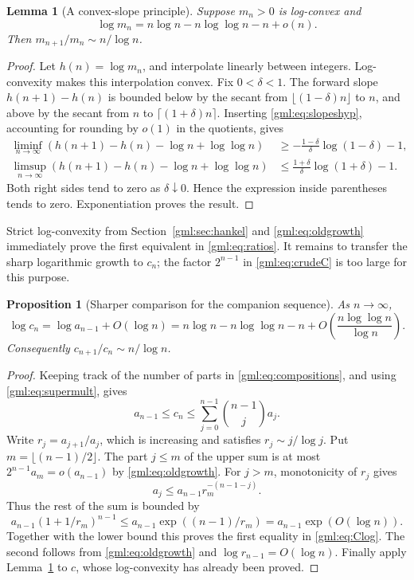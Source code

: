 \documentclass[11pt]{article}
\numberwithin{equation}{section}
\newtheorem{proposition}[theorem]{Proposition}
\newtheorem{lemma}[theorem]{Lemma}
\theoremstyle{definition}
\theoremstyle{remark}
\begin{document}
\begin{lemma}[A convex-slope principle]\label{gml:lem:slopes}
Suppose $m_n>0$ is log-convex and
\begin{equation}\label{gml:eq:slopeshyp}
 \log m_n=n\log n-n\log\log n-n+o(n).
\end{equation}
Then $m_{n+1}/m_n\sim n/\log n$.
\end{lemma}
\begin{proof}
Let $h(n)=\log m_n$, and interpolate linearly between integers. Log-convexity
makes this interpolation convex. Fix $0<\delta<1$. The forward slope
$h(n+1)-h(n)$ is bounded below by the secant from
$\lfloor(1-\delta)n\rfloor$ to $n$, and above by the secant from $n$
to $\lceil(1+\delta)n\rceil$. Inserting \eqref{gml:eq:slopeshyp}, accounting
for rounding by $o(1)$ in the quotients, gives
\begin{align*}
 \liminf_{n\to\infty}\left(h(n+1)-h(n)-\log n+\log\log n\right)
 &\ge -\frac{1-\delta}{\delta}\log(1-\delta)-1,\\
 \limsup_{n\to\infty}\left(h(n+1)-h(n)-\log n+\log\log n\right)
 &\le \frac{1+\delta}{\delta}\log(1+\delta)-1.
\end{align*}
Both right sides tend to zero as $\delta\downarrow0$. Hence the expression
inside parentheses tends to zero. Exponentiation proves the result.
\end{proof}

Strict log-convexity from Section~\ref{gml:sec:hankel} and
\eqref{gml:eq:oldgrowth} immediately prove the first equivalent in
\eqref{gml:eq:ratios}. It remains to transfer the sharp logarithmic growth to $c_n$;
the factor $2^{n-1}$ in \eqref{gml:eq:crudeC} is too large for this purpose.

\begin{proposition}[Sharper comparison for the companion sequence]\label{gml:prop:companion}
As $n\to\infty$,
\begin{equation}\label{gml:eq:Clog}
 \log c_n=\log a_{n-1}+O(\log n)
 =n\log n-n\log\log n-n+
 O\left(\frac{n\log\log n}{\log n}\right).
\end{equation}
Consequently $c_{n+1}/c_n\sim n/\log n$.
\end{proposition}
\begin{proof}
Keeping track of the number of parts in \eqref{gml:eq:compositions}, and
using \eqref{gml:eq:supermult}, gives
\begin{equation}\label{gml:eq:binomialC}
 a_{n-1}\le c_n\le\sum_{j=0}^{n-1}\binom{n-1}{j}a_j.
\end{equation}
Write $r_j=a_{j+1}/a_j$, which is increasing and satisfies
$r_j\sim j/\log j$. Put $m=\lfloor(n-1)/2\rfloor$.
The part $j\le m$ of the upper sum is at most $2^{n-1}a_m=o(a_{n-1})$
by \eqref{gml:eq:oldgrowth}. For $j>m$, monotonicity of $r_j$ gives
\[
 a_j\le a_{n-1}r_m^{-(n-1-j)}.
\]
Thus the rest of the sum is bounded by
\[
 a_{n-1}(1+1/r_m)^{n-1}
 \le a_{n-1}\exp((n-1)/r_m)
 =a_{n-1}\exp(O(\log n)).
\]
Together with the lower bound this proves the first equality in
\eqref{gml:eq:Clog}. The second follows from \eqref{gml:eq:oldgrowth} and
$\log r_{n-1}=O(\log n)$. Finally apply Lemma~\ref{gml:lem:slopes} to $c$,
whose log-convexity has already been proved.
\end{proof}
\end{document}
